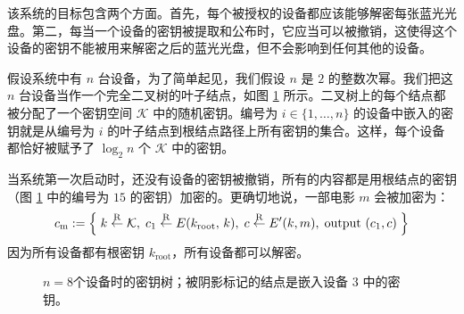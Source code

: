 该系统的目标包含两个方面。首先，每个被授权的设备都应该能够解密每张蓝光光盘。第二，每当一个设备的密钥被提取和公布时，它应当可以被撤销，这使得这个设备的密钥不能被用来解密之后的蓝光光盘，但不会影响到任何其他的设备。

\begin{snote}[一个可撤销的广播系统。]
假设系统中有 $n$ 台设备，为了简单起见，我们假设 $n$ 是 $2$ 的整数次幂。我们把这 $n$ 台设备当作一个完全二叉树的叶子结点，如图 \ref{fig:5-5} 所示。二叉树上的每个结点都被分配了一个密钥空间 $\mathcal{K}$ 中的随机密钥。编号为 $i\in\{1,\dots,n\}$ 的设备中嵌入的密钥就是从编号为 $i$ 的叶子结点到根结点路径上所有密钥的集合。这样，每个设备都恰好被赋予了 $\log_2n$ 个 $\mathcal{K}$ 中的密钥。

当系统第一次启动时，还没有设备的密钥被撤销，所有的内容都是用根结点的密钥（图 \ref{fig:5-5} 中的编号为 $15$ 的密钥）加密的。更确切地说，一部电影 $m$ 会被加密为：
\[
c_\mathrm{m}:=
\left\{
\;
k\overset{\rm R}\leftarrow\mathcal{K},\;
c_1\overset{\rm R}\leftarrow E(k_\mathrm{root},\,k),\;
c\overset{\rm R}\leftarrow E'(k,m),\;
\text{output } (c_1,c)\;
\right\}
\]
因为所有设备都有根密钥 $k_\mathrm{root}$，所有设备都可以解密。
\end{snote}


\begin{figure}
  \centering
  
  \caption{$n=8$个设备时的密钥树；被阴影标记的结点是嵌入设备 $3$ 中的密钥。}
  \label{fig:5-5}
\end{figure}

